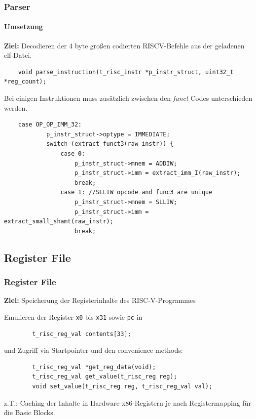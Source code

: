 \documentclass[german]{tum-presentation}
\begin{document}
\begin{frame}[fragile]
	\frametitle{Parser}
	\framesubtitle{Umsetzung}
	\textbf{Ziel:} Decodieren der 4 byte großen codierten RISCV-Befehle aus der geladenen elf-Datei.
	\begin{lstlisting}
	void parse_instruction(t_risc_instr *p_instr_struct, uint32_t *reg_count);
	\end{lstlisting}
	Bei einigen Instruktionen muss zusätzlich zwischen den \textit{funct} Codes unterschieden werden.
	\begin{lstlisting}
    case OP_OP_IMM_32:
            p_instr_struct->optype = IMMEDIATE;
            switch (extract_funct3(raw_instr)) {
                case 0:
                    p_instr_struct->mnem = ADDIW;
                    p_instr_struct->imm = extract_imm_I(raw_instr);
                    break;
                case 1: //SLLIW opcode and func3 are unique
                    p_instr_struct->mnem = SLLIW;
                    p_instr_struct->imm = extract_small_shamt(raw_instr);
                    break;
	\end{lstlisting}
\end{frame}



\subsection{Register File} %
\begin{frame}[fragile]
	\frametitle{Register File}
	\textbf{Ziel:} Speicherung der Registerinhalte des RISC-V-Programmes
	
	\vspace{1cm}
	\pause
	Emulieren der Register \verb!x0! bis \verb!x31! sowie \verb!pc! in
	\begin{lstlisting}
		t_risc_reg_val contents[33];
	\end{lstlisting}
	
	\pause
	und Zugriff via Startpointer und den convenience methods:
	
	\begin{lstlisting}
		t_risc_reg_val *get_reg_data(void);
		t_risc_reg_val get_value(t_risc_reg reg);
		void set_value(t_risc_reg reg, t_risc_reg_val val);
	\end{lstlisting}
	
	z.T.: Caching der Inhalte in Hardware-x86-Registern je nach Registermapping für die Basic Blocks.
\end{frame}
\end{document}

